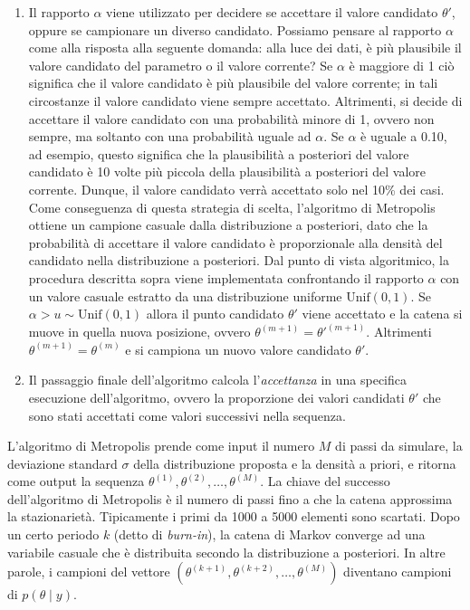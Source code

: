 \documentclass[
  11pt,
]{krantz}
\theoremstyle{definition}
\theoremstyle{definition}
\theoremstyle{definition}
\theoremstyle{definition}
\theoremstyle{remark}
\begin{document}
\begin{enumerate}
\def\labelenumi{(\alph{enumi})}
\setcounter{enumi}{3}
\item
  Il rapporto \(\alpha\) viene utilizzato per decidere se accettare il valore candidato \(\theta'\), oppure se campionare un diverso candidato. Possiamo pensare al rapporto \(\alpha\) come alla risposta alla seguente domanda: alla luce dei dati, è più plausibile il valore candidato del parametro o il valore corrente? Se \(\alpha\) è maggiore di 1 ciò significa che il valore candidato è più plausibile del valore corrente; in tali circostanze il valore candidato viene sempre accettato. Altrimenti, si decide di accettare il valore candidato con una probabilità minore di 1, ovvero non sempre, ma soltanto con una probabilità uguale ad \(\alpha\). Se \(\alpha\) è uguale a 0.10, ad esempio, questo significa che la plausibilità a posteriori del valore candidato è 10 volte più piccola della plausibilità a posteriori del valore corrente. Dunque, il valore candidato verrà accettato solo nel 10\% dei casi. Come conseguenza di questa strategia di scelta, l'algoritmo di Metropolis ottiene un campione casuale dalla distribuzione a posteriori, dato che la probabilità di accettare il valore candidato è proporzionale alla densità del candidato nella distribuzione a posteriori. Dal punto di vista algoritmico, la procedura descritta sopra viene implementata confrontando il rapporto \(\alpha\) con un valore casuale estratto da una distribuzione uniforme \(\mbox{Unif}(0, 1)\). Se \(\alpha > u \sim \mbox{Unif}(0, 1)\) allora il punto candidato \(\theta'\) viene accettato e la catena si muove in quella nuova posizione, ovvero \(\theta^{(m+1)} = \theta'^{(m+1)}\). Altrimenti \(\theta^{(m+1)} = \theta^{(m)}\) e si campiona un nuovo valore candidato \(\theta'\).
\item
  Il passaggio finale dell'algoritmo calcola l'\emph{accettanza} in una specifica esecuzione dell'algoritmo, ovvero la proporzione dei valori candidati \(\theta'\) che sono stati accettati come valori successivi nella sequenza.
\end{enumerate}

L'algoritmo di Metropolis prende come input il numero \(M\) di passi da simulare, la deviazione standard \(\sigma\) della distribuzione proposta e la densità a priori, e ritorna come output la sequenza \(\theta^{(1)}, \theta^{(2)}, \dots, \theta^{(M)}\). La chiave del successo dell'algoritmo di Metropolis è il numero di passi fino a che la catena approssima la stazionarietà. Tipicamente i primi da 1000 a 5000 elementi sono scartati. Dopo un certo periodo \(k\) (detto di \emph{burn-in}), la catena di Markov converge ad una variabile casuale che è distribuita secondo la distribuzione a posteriori. In altre parole, i campioni del vettore \(\left(\theta^{(k+1)}, \theta^{(k+2)}, \dots, \theta^{(M)}\right)\) diventano campioni di \(p(\theta \mid y)\).
\end{document}
